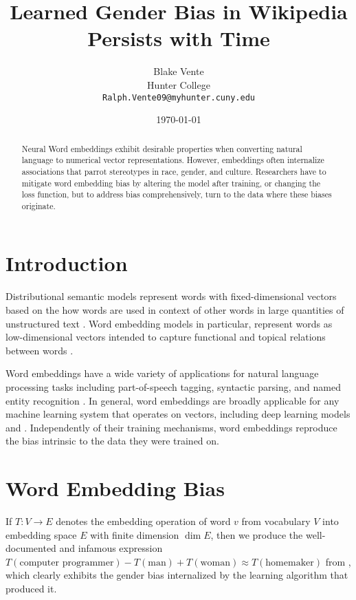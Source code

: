 \documentclass[11pt,a4paper]{article}
\title{Learned Gender Bias in Wikipedia Persists with Time}
\author{Blake Vente \\
  Hunter College\\
  \texttt{Ralph.Vente09@myhunter.cuny.edu}}
\date{\today{}}
\begin{document}
\maketitle
\begin{abstract}
Neural Word embeddings exhibit desirable properties when converting natural language to numerical vector representations. However, embeddings often internalize associations that parrot stereotypes in race, gender, and culture. Researchers have to mitigate word embedding bias by altering the model after training, or changing the loss function, but to address bias comprehensively, \citet{origins-1810-03611} turn to the data where these biases originate.
\end{abstract}

\section{Introduction}

Distributional semantic models represent words with fixed-dimensional vectors based on the how words are used in context of other words in large quantities of unstructured text \cite{lison2017redefining}. Word embedding models in particular, represent words as low-dimensional vectors intended to capture functional and topical relations between words \cite{lison2017redefining}.


Word embeddings have a wide variety of applications for natural language processing tasks including part-of-speech tagging, syntactic parsing, and named entity recognition \cite{lison2017redefining}. In general, word embeddings are broadly applicable for any machine learning system that operates on vectors, including deep learning models and . Independently of their training mechanisms, word embeddings reproduce the bias intrinsic to the data they were trained on.

\section{Word Embedding Bias}

If $T : V \to E$ denotes the embedding operation of word $v$ from vocabulary $V$ into embedding space $E$ with finite dimension $\dim E$, then we produce the well-documented and infamous expression $ T(\text{computer programmer}) - T(\mathrm{man}) + T(\mathrm{woman})  \approx T(\mathrm{homemaker})$ from \cite{biased_analogy-1607-06520}, which clearly exhibits the gender bias internalized by the learning algorithm that produced it.
\end{document}
